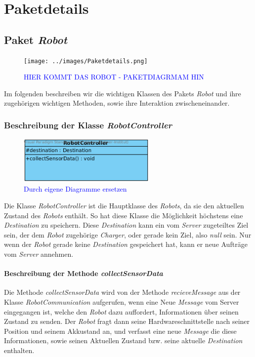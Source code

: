 \section{Paketdetails}

\subsection{Paket \textit{Robot}}
	\begin{figure}[H]
	\centering
	\texttt{[image: ../images/Paketdetails.png]}
	\caption{\textcolor{blue}{HIER KOMMT DAS ROBOT - PAKETDIAGRMAM HIN}}
	\label{Paketdetails}
	\end{figure}
	Im folgenden beschreiben wir die wichtigen Klassen des Pakets \textit{Robot} 
	und ihre zugehörigen wichtigen Methoden, sowie ihre Interaktion zwischeneinander. 


	\subsubsection{Beschreibung der Klasse \textit{RobotController}}
		\begin{figure}[H]
		\centering
		\includegraphics[width=0.6\textwidth]{../images/Iteration0_Entwurf_7-1-1_Klasse_RobotController}
		\caption{\textcolor{blue}{Durch eigene Diagramme ersetzen}}
		\label{BeschreibungKlasse1}
		\end{figure}
		
		Die Klasse \textit{RobotController} ist die Hauptklasse des \textit{Robots}, 
		da sie den aktuellen Zustand des \textit{Robots} enthält.
		So hat diese Klasse die Möglichkeit höchstens eine \textit{Destination} zu speichern. 
		Diese \textit{Destination} kann ein vom \textit{Server} zugeteiltes Ziel sein, 
		der dem \textit{Robot} zugehörige \textit{Charger}, oder gerade kein Ziel, 
		also \textit{null} sein. Nur wenn der \textit{Robot} gerade keine \textit{Destination} 
		gespeichert hat, kann er neue Aufträge vom \textit{Server} annehmen.

			\paragraph{Beschreibung der Methode \textit{collectSensorData}}
			Die Methode \textit{collectSensorData} wird von der Methode \textit{recieveMessage} 
			aus der Klasse \textit{RobotCommunication} aufgerufen, wenn eine Neue \textit{Message} 
			vom Server eingegangen ist, welche den \textit{Robot} dazu auffordert, Informationen 
			über seinen Zustand zu senden. Der \textit{Robot} fragt dann seine Hardwareschnittstelle 
			nach seiner Position und seinem Akkustand an, und verfasst eine neue \textit{Message} 
			die diese Informationen, sowie seinen Aktuellen Zustand bzw. seine aktuelle \textit{Destination} enthalten.

